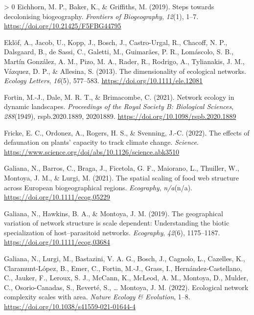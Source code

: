 \documentclass[10pt,oneside]{article}
\newlength{\cslhangindent}
\newenvironment{CSLReferences}[3] %
 {%
  \setlength{\parindent}{0pt}
  \ifodd #1 \everypar{\setlength{\hangindent}{\cslhangindent}}\ignorespaces\fi
  \ifnum #2 > 0
  \setlength{\parskip}{#2\baselineskip}
  \fi
 }%
 {}
\begin{document}
\begin{CSLReferences}{1}{0}
\leavevmode\hypertarget{ref-Eichhorn2019SteDec}{}%
Eichhorn, M. P., Baker, K., \& Griffiths, M. (2019). Steps towards
decolonising biogeography. \emph{Frontiers of Biogeography},
\emph{12}(1), 1--7. \url{https://doi.org/10.21425/F5FBG44795}

\leavevmode\hypertarget{ref-Eklof2013DimEco}{}%
Eklöf, A., Jacob, U., Kopp, J., Bosch, J., Castro-Urgal, R., Chacoff, N.
P., Dalsgaard, B., de Sassi, C., Galetti, M., Guimarães, P. R.,
Lomáscolo, S. B., Martín González, A. M., Pizo, M. A., Rader, R.,
Rodrigo, A., Tylianakis, J. M., Vázquez, D. P., \& Allesina, S. (2013).
The dimensionality of ecological networks. \emph{Ecology Letters},
\emph{16}(5), 577--583. \url{https://doi.org/10.1111/ele.12081}

\leavevmode\hypertarget{ref-Fortin2021NetEco}{}%
Fortin, M.-J., Dale, M. R. T., \& Brimacombe, C. (2021). Network ecology
in dynamic landscapes. \emph{Proceedings of the Royal Society B:
Biological Sciences}, \emph{288}(1949), rspb.2020.1889, 20201889.
\url{https://doi.org/10.1098/rspb.2020.1889}

\leavevmode\hypertarget{ref-Fricke2022EffDef}{}%
Fricke, E. C., Ordonez, A., Rogers, H. S., \& Svenning, J.-C. (2022).
The effects of defaunation on plants' capacity to track climate change.
\emph{Science}.
\url{https://www.science.org/doi/abs/10.1126/science.abk3510}

\leavevmode\hypertarget{ref-Galiana2021SpaSca}{}%
Galiana, N., Barros, C., Braga, J., Ficetola, G. F., Maiorano, L.,
Thuiller, W., Montoya, J. M., \& Lurgi, M. (2021). The spatial scaling
of food web structure across European biogeographical regions.
\emph{Ecography}, \emph{n/a}(n/a).
\url{https://doi.org/10.1111/ecog.05229}

\leavevmode\hypertarget{ref-Galiana2019GeoVar}{}%
Galiana, N., Hawkins, B. A., \& Montoya, J. M. (2019). The geographical
variation of network structure is scale dependent: Understanding the
biotic specialization of host--parasitoid networks. \emph{Ecography},
\emph{42}(6), 1175--1187. \url{https://doi.org/10.1111/ecog.03684}

\leavevmode\hypertarget{ref-Galiana2022EcoNet}{}%
Galiana, N., Lurgi, M., Bastazini, V. A. G., Bosch, J., Cagnolo, L.,
Cazelles, K., Claramunt-López, B., Emer, C., Fortin, M.-J., Grass, I.,
Hernández-Castellano, C., Jauker, F., Leroux, S. J., McCann, K., McLeod,
A. M., Montoya, D., Mulder, C., Osorio-Canadas, S., Reverté, S.,
\ldots{} Montoya, J. M. (2022). Ecological network complexity scales
with area. \emph{Nature Ecology \& Evolution}, 1--8.
\url{https://doi.org/10.1038/s41559-021-01644-4}


\end{CSLReferences}
\end{document}
